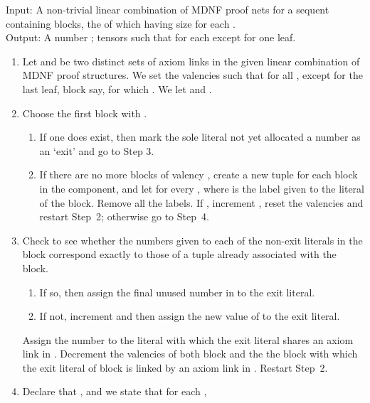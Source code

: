 \documentclass{LMCS}
\theoremstyle{plain}\newtheorem*{cLm}{Claim}
\begin{document}
  \begin{algo} \label{UniqueTupleAlg} Input: A non-trivial linear
    combination of MDNF proof nets for a sequent containing  blocks, the  of which having size  for each .
    \\ Output: A number ; tensors 
    such that  for
    each  except for one leaf.
  \end{algo}
  \begin{enumerate}
  \item Let  and  be two distinct sets of
    axiom links in the given linear combination of MDNF proof
    structures. We set the valencies  such that
     for all , except for the last leaf,
    block  say, for which . We let  and .
  \item Choose the first block  with .
    \begin{enumerate}
    \item If one does exist, then mark the sole literal not yet
      allocated a number as an `exit' and go to Step 3.
    \item If there are no more blocks of valency , create a new
       tuple  for each block  in the component,
      and let  for every , where 
      is the label given to the  literal of the block. Remove
      all the labels. If , increment , reset the valencies and
      restart Step~2; otherwise go to Step~4.
    \end{enumerate}
  
  \item Check to see whether the numbers given to each of the non-exit
    literals in the block correspond exactly to those of a tuple
     already associated with the
    block.
    \begin{enumerate}
    \item If so, then assign the final unused number in  to
      the exit literal.
    \item If not, increment  and then assign the new value of  to
      the exit literal.
    \end{enumerate}
    Assign the number to the literal with which the exit literal shares
    an axiom link in . Decrement the valencies of both
    block  and the the block with which the exit literal of block
     is linked by an axiom link in . Restart Step~2.
  
  \item Declare that , and we state that for each ,
     
  \end{enumerate}
  
\end{document}
